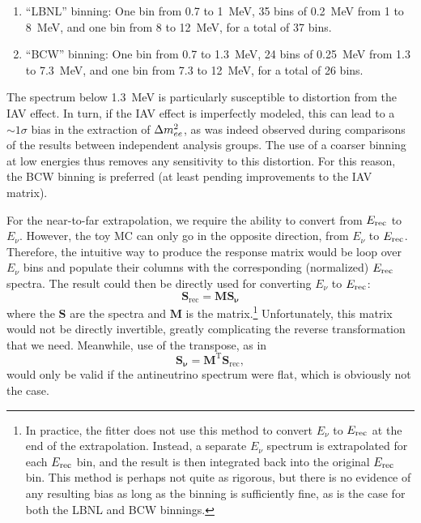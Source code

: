 \documentclass[../thesis.tex]{subfiles}
\begin{document}
\begin{enumerate}
\item ``LBNL'' binning: One bin from 0.7 to 1~MeV, 35 bins of 0.2~MeV from 1 to 8~MeV, and one bin from 8 to 12~MeV, for a total of 37 bins.
\item ``BCW'' binning: One bin from 0.7 to 1.3~MeV, 24 bins of 0.25~MeV from 1.3 to 7.3~MeV, and one bin from 7.3 to 12~MeV, for a total of 26 bins.
\end{enumerate}

The spectrum below 1.3~MeV is particularly susceptible to distortion from the IAV effect. In turn, if the IAV effect is imperfectly modeled, this can lead to a $\sim1\sigma$ bias in the extraction of $\Delta m^2_{ee}$, as was indeed observed during comparisons of the results between independent analysis groups. The use of a coarser binning at low energies thus removes any sensitivity to this distortion. For this reason, the BCW binning is preferred (at least pending improvements to the IAV matrix).

\begin{comment}
  I don't see any reason to mention the fact that a finer binning (2880 instead of 240) is used internally by the toy MC when generating this matrix. With the standard 240 bins, the edges line up with both the LBNL and BCW edges, so there shouldn't be any benefit from using a finer binning.

  deleted: Internally, the toy MC normally represents both neutrino and prompt energy using 240 bins (of 50~keV) from 0 to 12~MeV.
\end{comment}

For the near-to-far extrapolation, we require the ability to convert from $E_\mathrm{rec}$ to $E_\nu$. However, the toy MC can only go in the opposite direction, from $E_\nu$ to $E_\mathrm{rec}$. Therefore, the intuitive way to produce the response matrix would be loop over $E_\nu$ bins and populate their columns with the corresponding (normalized) $E_\mathrm{rec}$ spectra. The result could then be directly used for converting $E_\nu$ to $E_\mathrm{rec}$:
\begin{equation}
  \mathbf{S_{\mathrm{rec}}} = \mathbf{M} \mathbf{S_\nu} 
\end{equation}
where the $\mathbf{S}$ are the spectra and $\mathbf{M}$ is the matrix.\footnote{\label{foot:fitEnuToErec}In practice, the fitter does not use this method to convert $E_\nu$ to $E_\mathrm{rec}$ at the end of the extrapolation. Instead, a separate $E_\nu$ spectrum is extrapolated for each $E_\mathrm{rec}$ bin, and the result is then integrated back into the original $E_\mathrm{rec}$ bin. This method is perhaps not quite as rigorous, but there is no evidence of any resulting bias as long as the binning is sufficiently fine, as is the case for both the LBNL and BCW binnings.} Unfortunately, this matrix would not be directly invertible, greatly complicating the reverse transformation that we need. Meanwhile, use of the transpose, as in
\begin{equation}
  \mathbf{S_\nu} = \mathbf{M^{\mathrm{T}}} \mathbf{S_{\mathrm{rec}}},
\end{equation}
would only be valid if the antineutrino spectrum were flat, which is obviously not the case.
\end{document}
